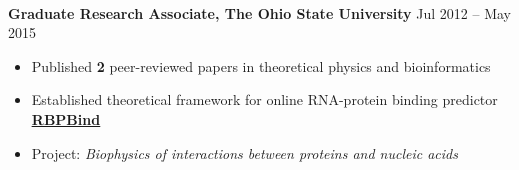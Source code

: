 \documentclass[11pt,letterpaper, sans]{article}
\begin{document}
\begin{flushleft}
\vspace{-1.5em}\ \

{\bf Graduate Research Associate, %
The Ohio State University}  \hfill Jul 2012 -- May 2015
\vspace{-0.5em} \\
\begin{itemize}[leftmargin=*]\itemsep-0.1em
\item Published {\bf 2} peer-reviewed papers in theoretical physics and bioinformatics
\item Established theoretical framework for online RNA-protein binding predictor \href{http://bioserv.mps.ohio-state.edu/RBPBind/}{\underline{\bf RBPBind}}
\item Project: {\it Biophysics of interactions between proteins and nucleic acids}
\end{itemize}




\end{flushleft}
\end{document}
